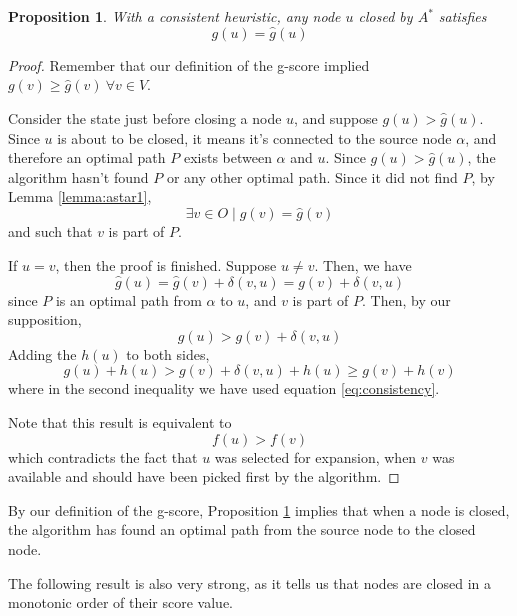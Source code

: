 \documentclass[12pt]{report}
\newtheorem{proposition}[theorem]{Proposition}
\begin{document}
\begin{proposition}
\label{prop:closed-optimal}
With a consistent heuristic, any node $u$ closed by $A^*$ satisfies
\[ g(u) = \hat{g}(u) \]
\end{proposition}
\begin{proof}
Remember that our definition of the g-score implied $g(v) \geq \hat{g}(v) \ \forall v \in V$.

Consider the state just before closing a node $u$, and suppose $g(u) > \hat{g}(u)$. Since $u$ is about to be closed, it means it's connected to the source node $\alpha$, and therefore an optimal path $P$ exists between $\alpha$ and $u$. Since $g(u) > \hat{g}(u)$, the algorithm hasn't found $P$ or any other optimal path. Since it did not find $P$, by Lemma \ref{lemma:astar1},
\[ \exists v \in O \mid g(v) = \hat{g}(v) \]
and such that $v$ is part of $P$.

If $u = v$, then the proof is finished. Suppose $u \neq v$. Then, we have
\[ \hat{g}(u) = \hat{g}(v) + \delta(v, u) = g(v) + \delta(v, u) \]
since $P$ is an optimal path from $\alpha$ to $u$, and $v$ is part of $P$. Then, by our supposition,
\[ g(u) > g(v) + \delta(v, u) \]
Adding the $h(u)$ to both sides,
\[ g(u) + h(u) > g(v) + \delta(v, u) + h(u) \geq g(v) + h(v) \]
where in the second inequality we have used equation \ref{eq:consistency}.

Note that this result is equivalent to
\[ f(u) > f(v) \]
which contradicts the fact that $u$ was selected for expansion, when $v$ was available and should have been picked first by the algorithm.
\end{proof}

By our definition of the g-score, Proposition \ref{prop:closed-optimal} implies that when a node is closed, the algorithm has found an optimal path from the source node to the closed node.

The following result is also very strong, as it tells us that nodes are closed in a monotonic order of their score value.
\end{document}
